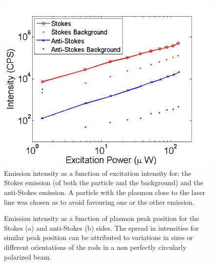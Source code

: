 \documentclass[journal=nalefd,manuscript=letter]{achemso}
\begin{document}
\begin{figure}[p]
\centering
	\includegraphics[width=0.4\linewidth]{plce_4_bis.png}
	\caption{Emission intensity as a function of excitation intensity for: the
	Stokes emission (of both the particle and the background) and the anti-Stokes
	emission. A particle with the plasmon close to the laser line was chosen as to
	avoid favouring one or the other emission.}
	\label{fig:power_intensity}
\end{figure}

\begin{figure}[p]
\centering
	\caption{Emission intensity as a function of plasmon peak position for the
	Stokes (a) and anti-Stokes (b) sides. The spread in intensities for similar
	peak position can be attributed to variations in sizes or different
	orientations of the rods in a non perfectly circularly polarized beam.}
	\label{fig:emission_peak_position}
\end{figure}
\end{document}
